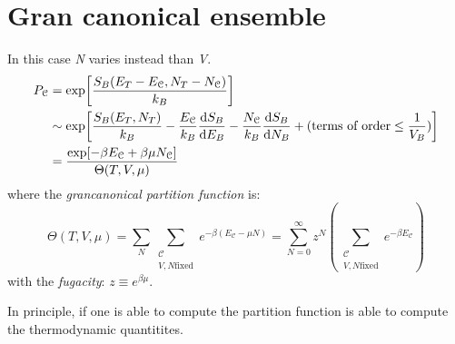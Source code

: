 \documentclass[../main/main.tex]{subfiles}
\begin{document}
\section{Gran canonical ensemble}
In this case \emph{N} varies instead than \emph{V}.
\begin{equation}
\begin{split}
P_{\mathcal{C}}  &= \exp [\frac{S_B (E_T - E_{\mathcal{C}},N_T - N_{\mathcal{C}})}{k_B}] \\
& \sim \exp [\frac{S_B(E_T,N_T)}{k_B}- \frac{E_{\mathcal{C}}}{k_B} \dv{S_B}{E_B}- \frac{N_{\mathcal{C}}}{k_B} \dv{S_B}{N_B} + (\text{terms of order} \le \frac{1}{V_B}) ] \\
& = \frac{\exp [-\beta E_{\mathcal{C}}+ \beta \mu N_{\mathcal{C}}] }{\Theta (T,V,\mu )}
\end{split}
\end{equation}
where the \emph{grancanonical partition function} is:
\begin{equation}
  \Theta (T,V,\mu ) = \sum_{N}^{} \sum_{\substack{\mathcal{C} \\ V,N \text{fixed}} }^{} e^{-\beta (E_{\mathcal{C}}- \mu N)} = \sum_{N=0}^{\infty } z^N (\sum_{\substack{\mathcal{C} \\ V,N \text{fixed}} }^{} e^{-\beta E_{\mathcal{C}}}  )
\end{equation}
with the \emph{fugacity}: \( z \equiv e^{\beta \mu }  \).


In principle, if one is able to compute the partition function is able to compute the thermodynamic quantitites.
\end{document}
